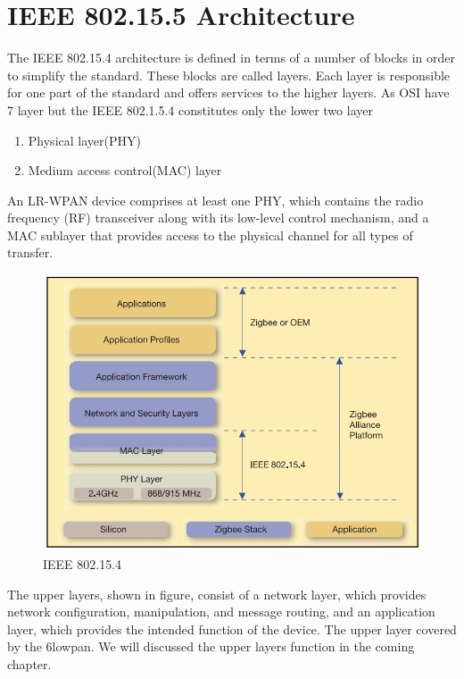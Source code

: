 \section{IEEE 802.15.5 Architecture}
The IEEE 802.15.4 architecture is defined in terms of a number of blocks in order to simplify the standard. These blocks are called layers. Each layer is responsible for one part of the standard and offers services to the higher layers. As OSI have 7 layer but the IEEE 802.1.5.4 constitutes only the lower two layer\\
\begin{enumerate}

	\item{Physical layer(PHY)}
	\item{Medium access control(MAC) layer}
\end{enumerate}
	An LR-WPAN device comprises at least one PHY, which contains the radio frequency (RF) transceiver along with its low-level control mechanism, and a MAC sublayer that provides access to the physical channel for all types of transfer.



\begin{figure}[ht]
	\centering
	\includegraphics[scale=0.7]{images/ieee.png}
	\caption{IEEE 802.15.4}
\end{figure}
The upper layers, shown in figure, consist of a network layer, which provides network configuration, manipulation, and message routing, and an application layer, which provides the intended function of the device. The upper layer covered by the 6lowpan. We will discussed the upper layers function in the coming chapter.
